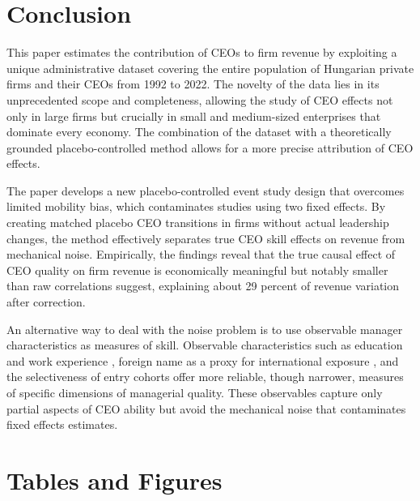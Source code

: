 \documentclass[11pt,a4paper]{article}
\begin{document}
\section{Conclusion}

This paper estimates the contribution of CEOs to firm revenue by exploiting a unique administrative dataset covering the entire population of Hungarian private firms and their CEOs from 1992 to 2022. The novelty of the data lies in its unprecedented scope and completeness, allowing the study of CEO effects not only in large firms but crucially in small and medium-sized enterprises that dominate every economy. The combination of the dataset with a theoretically grounded placebo-controlled method allows for a more precise attribution of CEO effects. 

The paper develops a new placebo-controlled event study design that overcomes limited mobility bias, which contaminates studies using two fixed effects.  By creating matched placebo CEO transitions in firms without actual leadership changes, the method effectively separates true CEO skill effects on revenue from mechanical noise. Empirically, the findings reveal that the true causal effect of CEO quality on firm revenue is economically meaningful but notably smaller than raw correlations suggest, explaining about 29 percent of revenue variation after correction. 

An alternative way to deal with the noise problem is to use observable manager characteristics as measures of skill. Observable characteristics such as education and work experience \citep{DePirro2025}, foreign name as a proxy for international exposure \citep{Koren2023expat}, and the selectiveness of entry cohorts \citep{koren2024managers} offer more reliable, though narrower, measures of specific dimensions of managerial quality. These observables capture only partial aspects of CEO ability but avoid the mechanical noise that contaminates fixed effects estimates.

\clearpage


\clearpage

\section*{Tables and Figures}
\end{document}
